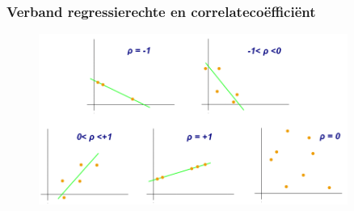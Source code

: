 \documentclass{beamer}
\begin{document}
    \begin{frame}
      \frametitle{Verband regressierechte en correlateco\"effici\"ent}

      \begin{figure}
        \centering
        \includegraphics[width=0.90\textwidth]{img/les3-regressie.png}
        \label{fig:les3-regressie}
      \end{figure}

    \end{frame}


    
\end{document}
